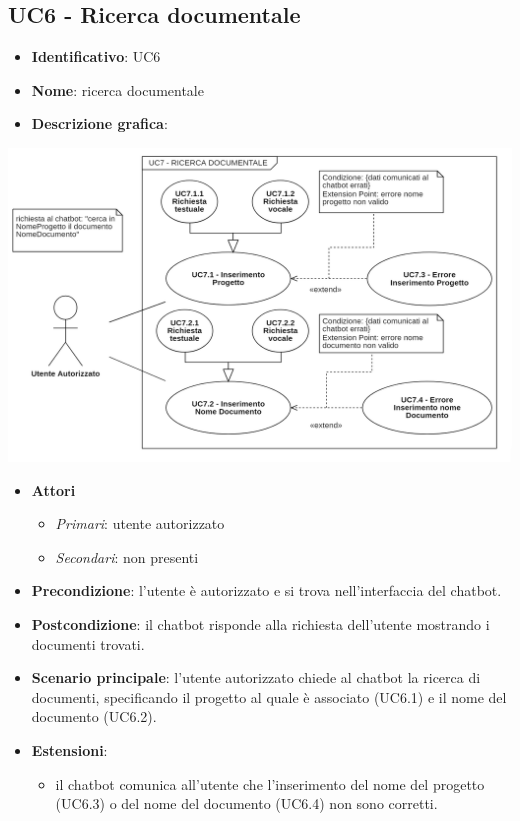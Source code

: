 \subsection{UC6 - Ricerca documentale}
\begin{itemize}
    \item \textbf{Identificativo}: UC6
    \item \textbf{Nome}: ricerca documentale
    \item \textbf{Descrizione grafica}:
\end{itemize}
\begin{center}
    \includegraphics{images/UC6.png} 
\end{center}
 \begin{itemize}
    \item \textbf{Attori}
 \begin{itemize} 
    \item \textit{Primari}: utente autorizzato
    \item \textit{Secondari}: non presenti
 \end{itemize}
 \item \textbf{Precondizione}: l'utente è autorizzato e si trova nell'interfaccia del chatbot.
 \item \textbf{Postcondizione}: il chatbot risponde alla richiesta dell'utente mostrando i documenti trovati.
 \item \textbf{Scenario principale}: l'utente autorizzato chiede al chatbot la ricerca di documenti, specificando il progetto al quale è associato (UC6.1) e il nome del documento (UC6.2).
 \item \textbf{Estensioni}: 
 \begin{itemize} 
    \item il chatbot comunica all'utente che l'inserimento del nome del progetto (UC6.3) o del nome del documento (UC6.4) non sono corretti.
 \end{itemize}
\end{itemize}
\newpage
